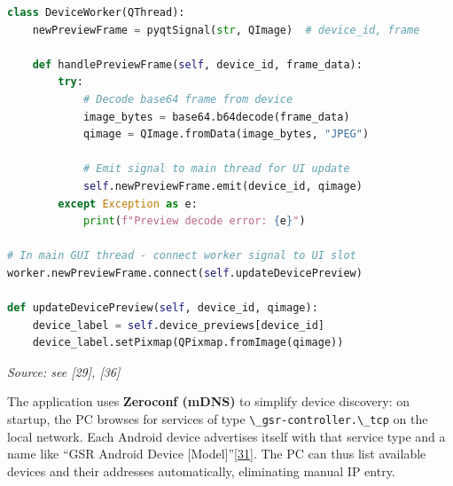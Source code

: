 \documentclass[12pt,a4paper]{article}
\begin{document}
\begin{lstlisting}[language=Python]
class DeviceWorker(QThread):
    newPreviewFrame = pyqtSignal(str, QImage)  # device_id, frame
    
    def handlePreviewFrame(self, device_id, frame_data):
        try:
            # Decode base64 frame from device
            image_bytes = base64.b64decode(frame_data)
            qimage = QImage.fromData(image_bytes, "JPEG")
            
            # Emit signal to main thread for UI update
            self.newPreviewFrame.emit(device_id, qimage)
        except Exception as e:
            print(f"Preview decode error: {e}")

# In main GUI thread - connect worker signal to UI slot
worker.newPreviewFrame.connect(self.updateDevicePreview)

def updateDevicePreview(self, device_id, qimage):
    device_label = self.device_previews[device_id]
    device_label.setPixmap(QPixmap.fromImage(qimage))
\end{lstlisting}

\emph{Source: see {[}29{]}, {[}36{]}}

The application uses \textbf{Zeroconf (mDNS)} to simplify device discovery: on startup, the PC browses for services of type \passthrough{\lstinline!\_gsr-controller.\_tcp!} on the local network. Each Android device advertises itself with that service type and a name like ``GSR Android Device {[}Model{]}''\href{https://github.com/buccancs/GSR-Dual-Video-System/blob/05ae360cb7b4ae7c7861f72deb235ad64a74b38e/android/app/src/main/java/com/yourcompany/gsrcapture/network/NsdHelper.kt\#L34-L41}{{[}31{]}}. The PC can thus list available devices and their addresses automatically, eliminating manual IP entry.
\end{document}
